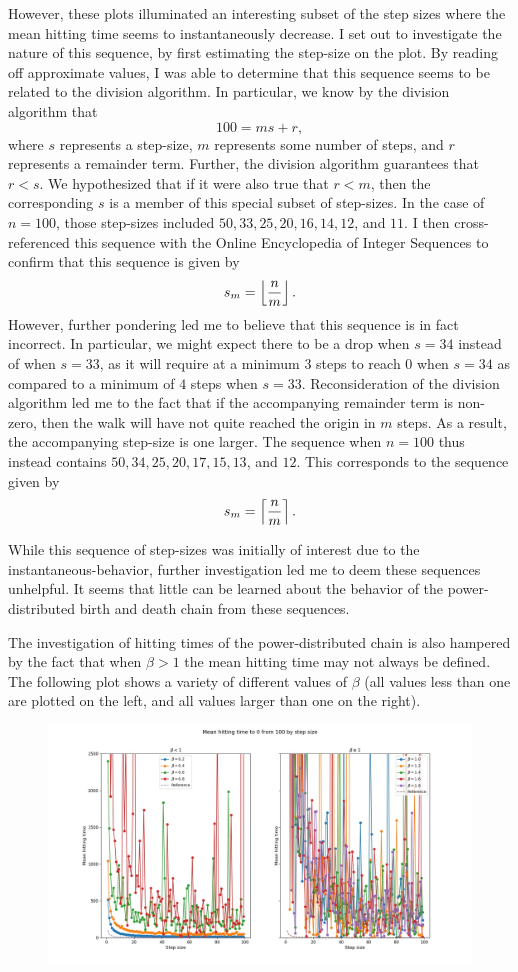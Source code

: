 However, these plots illuminated an interesting subset of the step sizes where the mean hitting time
seems to instantaneously decrease. I set out to investigate the nature of this sequence, by first
estimating the step-size on the plot. By reading off approximate values, I was able to determine that
this sequence seems to be related to the division algorithm. In particular, we know by the division
algorithm that
\[
    100 = ms + r,
\]
where $s$ represents a step-size, $m$ represents some number of steps, and $r$ represents a remainder
term. Further, the division algorithm guarantees that $r < s$. We hypothesized that if it were also true
that $r < m$, then the corresponding $s$ is a member of this special subset of step-sizes. In the case
of $n=100$, those step-sizes included $50, 33, 25, 20, 16, 14, 12$, and $11$. I then cross-referenced
this sequence with the Online Encyclopedia of Integer Sequences to confirm that this sequence is given
by
\[
    s_{m} = \left\lfloor \frac{n}{m} \right\rfloor.
\]
However, further pondering led me to believe that this sequence is in fact incorrect. In particular, we
might expect there to be a drop when $s = 34$ instead of when $s = 33$, as it will require at a minimum
$3$ steps to reach $0$ when $s = 34$ as compared to a minimum of $4$ steps when $s = 33$.
Reconsideration of the division algorithm led me to the fact that if the accompanying remainder term is
non-zero, then the walk will have not quite reached the origin in $m$ steps. As a result, the
accompanying step-size is one larger. The sequence when $n=100$ thus instead contains $50, 34, 25, 20,
17, 15, 13$, and $12$. This corresponds to the sequence given by
\[
    s_m = \left\lceil \frac{n}{m} \right\rceil.  
\]

While this sequence of step-sizes was initially of interest due to the instantaneous-behavior, further
investigation led me to deem these sequences unhelpful. It seems that little can be learned about the
behavior of the power-distributed birth and death chain from these sequences.

The investigation of hitting times of the power-distributed chain is also hampered by the fact that when
$\beta > 1$ the mean hitting time may not always be defined. The following plot shows a variety of
different values of $\beta$ (all values less than one are plotted on the left, and all values larger
than one on the right).

\noindent
\begin{figure}[H]
    \includegraphics[width=\textwidth]{plots/hittingtimesplot3.jpg}
    \centering
\end{figure}

